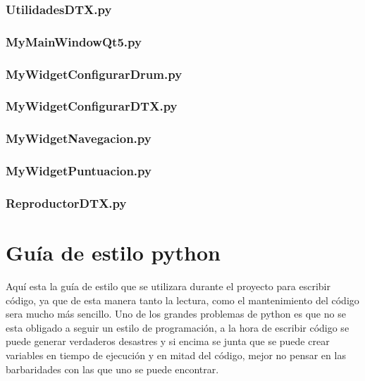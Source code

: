 \documentclass[a4paper,11pt,oneside]{book}
\begin{document}


\subsection{UtilidadesDTX.py}



\subsection{MyMainWindowQt5.py}



\subsection{MyWidgetConfigurarDrum.py}



\subsection{MyWidgetConfigurarDTX.py}



\subsection{MyWidgetNavegacion.py}



\subsection{MyWidgetPuntuacion.py}



\subsection{ReproductorDTX.py}




\chapter{Guía de estilo python}
Aquí esta la guía de estilo que se utilizara durante el proyecto para escribir código, ya que de esta manera tanto la lectura, como el mantenimiento del código sera mucho más sencillo.
Uno de los grandes problemas de python es que no se esta obligado a seguir un estilo de programación, a la hora de escribir código se puede generar verdaderos desastres y si encima se junta que se puede crear variables en tiempo de ejecución y en mitad del código, mejor no pensar en las barbaridades con las que uno se puede encontrar.
\end{document}
